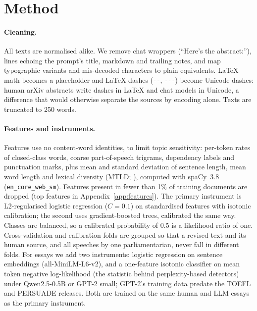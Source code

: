 \documentclass[11pt]{article}
\newcommand{\gptii}{\mbox{GPT-2}}
\begin{document}
\section{Method}
\label{sec:method}

\paragraph{Cleaning.}
All texts are normalised alike. We remove chat wrappers (``Here's the abstract:''), lines echoing the prompt's title, markdown and trailing notes, and map typographic variants and mis-decoded characters to plain equivalents. LaTeX math becomes a placeholder and LaTeX dashes (\texttt{-{}-}, \texttt{-{}-{}-}) become Unicode dashes: human arXiv abstracts write dashes in LaTeX and chat models in Unicode, a difference that would otherwise separate the sources by encoding alone. Texts are truncated to 250 words.

\paragraph{Features and instruments.}
Features use no content-word identities, to limit topic sensitivity: per-token rates of closed-class words, coarse
part-of-speech trigrams, dependency labels and punctuation marks, plus mean and standard deviation of sentence
length, mean word length and lexical diversity (MTLD; \citealp{mccarthy2010}), computed with spaCy~3.8
(\texttt{en\_core\_web\_sm}). Features present in fewer than 1\% of training documents are dropped
(top features in Appendix~\ref{app:features}). The primary instrument is L2-regularised logistic regression
($C{=}0.1$) on standardised features with isotonic calibration; the second uses gradient-boosted trees,
calibrated the same way. Classes are balanced, so a calibrated probability of 0.5 is a likelihood ratio of one.
Cross-validation and calibration folds are grouped so that a revised text and its human source, and all speeches
by one parliamentarian, never fall in different folds. For essays we add two instruments: logistic regression on
sentence embeddings (all-MiniLM-L6-v2), and a one-feature isotonic classifier on mean token negative log-likelihood (the statistic behind perplexity-based detectors) under Qwen2.5-0.5B or \gptii{} small; \gptii{}'s training data predate the TOEFL and PERSUADE releases. Both are trained on the
same human and LLM essays as the primary instrument.
\end{document}
